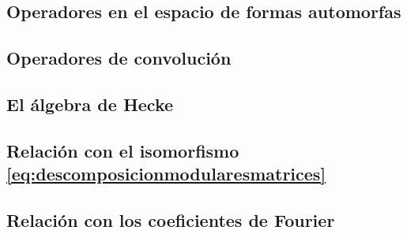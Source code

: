 

\subsection{Operadores en el espacio de formas automorfas}%
	\label{subsec:operadoresenformasautomorfas}


\subsection{Operadores de convoluci\'{o}n}%
	\label{subsec:operadoresdeconvolucion}


\subsection{El \'{a}lgebra de Hecke}\label{subsec:elalgebradehecke}


\subsection{Relaci\'{o}n con el isomorfismo %
	\eqref{eq:descomposicionmodularesmatrices}}%
	\label{subsec:relacionconeliso}


% 

\subsection{Relaci\'{o}n con los coeficientes de Fourier}
	\label{subsec:relacionconfourier}

